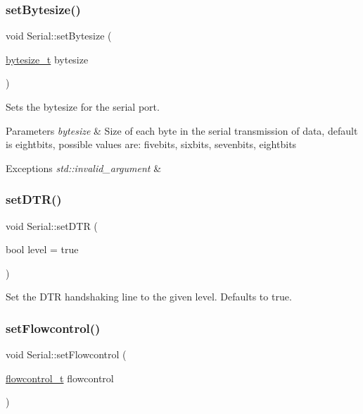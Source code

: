 \subsubsection{\texorpdfstring{set\+Bytesize()}{setBytesize()}}
{\footnotesize\ttfamily void Serial\+::set\+Bytesize (\begin{DoxyParamCaption}\item[{\mbox{\hyperlink{namespaceserial_a00b3281fa11cea770c0b0c8a106080f8}{bytesize\+\_\+t}}}]{bytesize }\end{DoxyParamCaption})}

Sets the bytesize for the serial port.


\begin{DoxyParams}{Parameters}
{\em bytesize} & Size of each byte in the serial transmission of data, default is eightbits, possible values are\+: fivebits, sixbits, sevenbits, eightbits\\
\hline
\end{DoxyParams}

\begin{DoxyExceptions}{Exceptions}
{\em std\+::invalid\+\_\+argument} & \\
\hline
\end{DoxyExceptions}
\mbox{\label{classserial_1_1_serial_ac9b0bbf613a5fe68f05d1d40181a1bb3}} 
\subsubsection{\texorpdfstring{set\+D\+T\+R()}{setDTR()}}
{\footnotesize\ttfamily void Serial\+::set\+D\+TR (\begin{DoxyParamCaption}\item[{bool}]{level = {\ttfamily true} }\end{DoxyParamCaption})}

Set the D\+TR handshaking line to the given level. Defaults to true. \mbox{\label{classserial_1_1_serial_ade41650d6bfe91b6432e5a0a60c03969}} 
\subsubsection{\texorpdfstring{set\+Flowcontrol()}{setFlowcontrol()}}
{\footnotesize\ttfamily void Serial\+::set\+Flowcontrol (\begin{DoxyParamCaption}\item[{\mbox{\hyperlink{namespaceserial_a93ef57a314b4e562f9eded6c15d34351}{flowcontrol\+\_\+t}}}]{flowcontrol }\end{DoxyParamCaption})}

